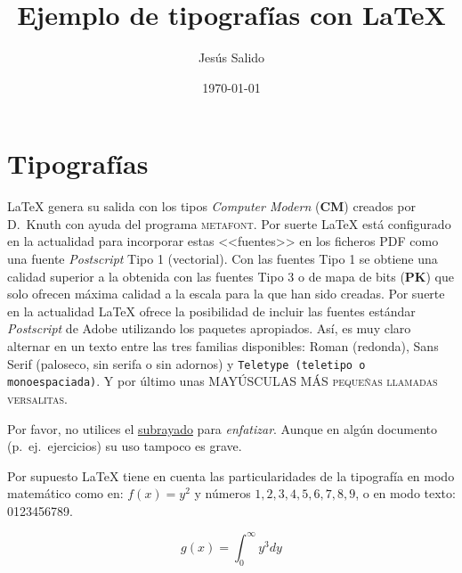 \documentclass[11pt,a4paper]{article}
\title{Ejemplo de tipografías con \LaTeX}
\author{Jesús Salido}
\date{\today}
\begin{document}
\maketitle


\section{Tipografías}
\LaTeX{} genera su salida con los tipos \emph{Computer Modern} 
(\textbf{CM}) creados por D.~Knuth con ayuda del programa 
\textsc{metafont}. Por suerte \LaTeX{} está configurado en la actualidad 
para incorporar estas <<fuentes>> en los ficheros PDF como una fuente 
\emph{Postscript} Tipo 1 (vectorial). Con las fuentes Tipo 1 se obtiene una 
calidad superior a la obtenida con las fuentes Tipo 3 o de mapa de bits 
(\textbf{PK}) que solo ofrecen máxima calidad a la escala para la que han 
sido creadas. Por suerte en la actualidad \LaTeX{} ofrece la posibilidad de 
incluir las fuentes estándar \emph{Postscript} de \textsf{Adobe} utilizando 
los paquetes apropiados. Así, es muy claro alternar en un texto entre las 
tres familias disponibles: Roman (redonda), \textsf{Sans Serif (paloseco, 
sin serifa o sin adornos)} y \texttt{Teletype (teletipo o monoespaciada)}. 
Y por último unas MAYÚSCULAS MÁS \textsc{pequeñas llamadas versalitas}.

Por favor, no utilices el \underline{subrayado} para \emph{enfatizar}. Aunque en algún documento (p.~ej.\ ejercicios) su uso tampoco es grave.

Por supuesto \LaTeX{} tiene en cuenta las particularidades de la tipografía 
en modo matemático como en: $f(x)=y^2$ y números $1,2,3,4,5,6,7,8,9$, o en 
modo texto: 0123456789.

$$g(x)=\int_{0}^{\infty}y^{3}dy$$
\end{document}
